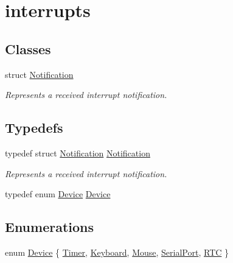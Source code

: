 \hypertarget{group__interrupts}{}\section{interrupts}
\label{group__interrupts}
\subsection*{Classes}
\begin{DoxyCompactItemize}
\item 
struct \mbox{\hyperlink{struct_notification}{Notification}}
\begin{DoxyCompactList}\small\item\em Represents a received interrupt notification. \end{DoxyCompactList}\end{DoxyCompactItemize}
\subsection*{Typedefs}
\begin{DoxyCompactItemize}
\item 
typedef struct \mbox{\hyperlink{struct_notification}{Notification}} \mbox{\hyperlink{group__interrupts_ga856319b58b1fcbc4b74dc4c26524e7d7}{Notification}}
\begin{DoxyCompactList}\small\item\em Represents a received interrupt notification. \end{DoxyCompactList}\item 
typedef enum \mbox{\hyperlink{group__interrupts_gadb53a8cc97236ca207c035241a5b7fb8}{Device}} \mbox{\hyperlink{group__interrupts_ga190b45b11d58f95bf84392b54e437fdd}{Device}}
\end{DoxyCompactItemize}
\subsection*{Enumerations}
\begin{DoxyCompactItemize}
\item 
enum \mbox{\hyperlink{group__interrupts_gadb53a8cc97236ca207c035241a5b7fb8}{Device}} \{ \newline
\mbox{\hyperlink{group__interrupts_ggadb53a8cc97236ca207c035241a5b7fb8a3b83fbd6b78e3a551d1d7577bbee233f}{Timer}}, 
\mbox{\hyperlink{group__interrupts_ggadb53a8cc97236ca207c035241a5b7fb8a2638745099fac18206ad65ef7479e7f2}{Keyboard}}, 
\mbox{\hyperlink{group__interrupts_ggadb53a8cc97236ca207c035241a5b7fb8a3f366d19b692520f76c2e34d5dc45ef5}{Mouse}}, 
\mbox{\hyperlink{group__interrupts_ggadb53a8cc97236ca207c035241a5b7fb8a56c347f79e72faded9bfee74aecf976a}{Serial\+Port}}, 
\newline
\mbox{\hyperlink{group__interrupts_ggadb53a8cc97236ca207c035241a5b7fb8a24073a11916b946561b8cb5c9dfe9bce}{R\+TC}}
 \}
\end{DoxyCompactItemize}
